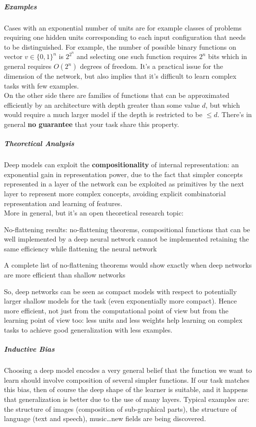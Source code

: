 \documentclass[10pt]{report}
\begin{document}
\subparagraph{Examples} Cases with an exponential number of units are for example classes of problems requiring one hidden units corresponding to each input configuration that needs to be distinguished. For example, the number of possible binary functions on vector $v\in\{0,1\}^n$ is $2^{2^n}$ and selecting one such function requires $2^n$ bits which in general requires $O(2^n)$ degrees of freedom. It's a practical issue for the dimension of the network, but also implies that it's difficult to learn complex tasks with few examples.\\
On the other side there are families of functions that can be approximated efficiently by an architecture with depth greater than some value $d$, but which would require a much larger model if the depth is restricted to be $\leq d$. There's in general \textbf{no guarantee} that your task share this property.
\subparagraph{Theoretical Analysis} Deep models can exploit the \textbf{compositionality} of internal representation: an exponential gain in representation power, due to the fact that simpler concepts represented in a layer of the network can be exploited as primitives by the next layer to represent more complex concepts, avoiding explicit combinatorial representation and learning of features.\\
More in general, but it's an open theoretical research topic:
\begin{list}{}{}
	\item No-flattening results: no-flattening theorems, compositional functions that can be well implemented by a deep neural network cannot be implemented retaining the same efficiency while flattening the neural network
	\item A complete list of no-flattening theorems would show exactly when deep networks are more efficient than shallow networks
\end{list}
So, deep networks can be seen as compact models with respect to potentially larger shallow models for the task (even exponentially more compact). Hence more efficient, not just from the computational point of view but from the learning point of view too: less units and less weights help learning on complex tasks to achieve good generalization with less examples.
\subparagraph{Inductive Bias} Choosing a deep model encodes a very general belief that the function we want to learn should involve composition of several simpler functions. If our task matches this bias, then of course the deep shape of the learner is suitable, and it happens that generalization is better due to the use of many layers. Typical examples are: the structure of images (composition of sub-graphical parts), the structure of language (text and speech), music\ldots new fields are being discovered.\\
\end{document}
